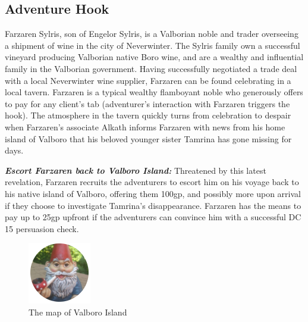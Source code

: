 \begin{multicols*}{2}
	\subsection*{Adventure Hook}
	Farzaren Sylris, son of Engelor Sylris, is a Valborian noble and trader overseeing a shipment of wine in the city of Neverwinter. The Sylris family own a successful vineyard producing Valborian native Boro wine, and are a wealthy and influential family in the Valborian government. Having successfully negotiated a trade deal with a local Neverwinter wine supplier, Farzaren can be found celebrating in a local tavern. Farzaren is a typical wealthy flamboyant noble who generously offers to pay for any client’s tab (adventurer’s interaction with Farzaren triggers the hook). The atmosphere in the tavern quickly turns from celebration to despair when Farzaren’s associate Alkath informs Farzaren with news from his home island of Valboro that his beloved younger sister Tamrina has gone missing for days. 
	
	\textbf{\textit{Escort Farzaren back to Valboro Island:}} Threatened by this latest revelation, Farzaren recruits the adventurers to escort him on his voyage back to his native island of Valboro, offering them 100gp, and possibly more upon arrival if they choose to investigate Tamrina’s disappearance. Farzaren has the means to pay up to 25gp upfront if the adventurers can convince him with a successful DC 15 persuasion check.
	
	\begin{figure}
		\includegraphics[width=\textwidth]{images/placeholder}
		\caption{The map of Valboro Island}
	\end{figure}
	
\end{multicols*}